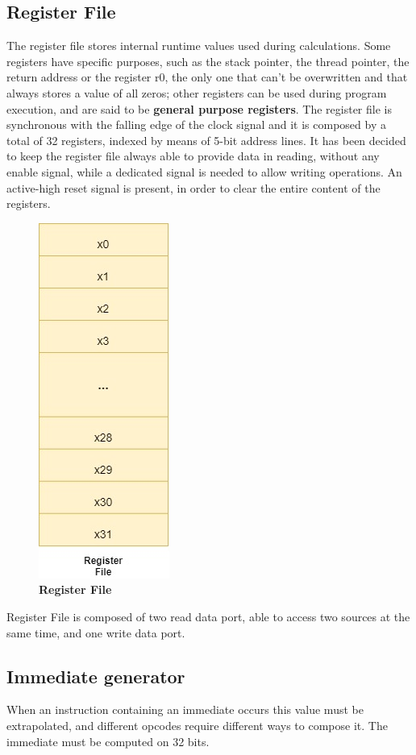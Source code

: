 \subsection{Register File}

The register file stores internal runtime values used during calculations.
Some registers have specific purposes, such as the stack pointer, the thread pointer, the return address or the register r0, the only one that can't be overwritten 
and that always stores a value of all zeros; other registers can be used during program execution, and are said to be \textbf{general purpose registers}.
The register file is synchronous with the falling edge of the clock signal and it is composed by a total of 32 registers, indexed by means of 5-bit address lines.
It has been decided to keep the register file always able to provide data in reading, without any enable signal, while a dedicated signal is needed to allow writing operations.
An active-high reset signal is present, in order to clear the entire content of the registers.

\begin{figure}[!h]
    \centering
        \includegraphics[width=0.2\linewidth]{schematic/RegisterFile.jpg}
        \caption{\textbf{Register File}}
\end{figure}
    
Register File is composed of two read data port, able to access two sources at the same time, and one write data port.

\clearpage

\subsection{Immediate generator}

When an instruction containing an immediate occurs this value must be extrapolated, and different opcodes require 
different ways to compose it. The immediate must be computed on 32 bits.

